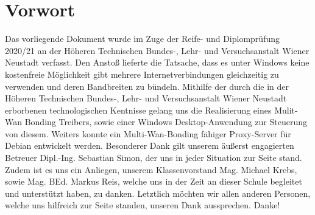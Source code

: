 \chapter{Vorwort}

Das vorliegende Dokument wurde im Zuge der Reife- und Diplomprüfung 2020/21 an
der Höheren Technischen Bundes-, Lehr- und Versuchsanstalt Wiener Neustadt verfasst.
\newline
\newline
Den Anstoß lieferte die Tatsache, dass es unter Windows keine kostenfreie Möglichkeit gibt mehrere Internetverbindungen gleichzeitig zu verwenden und deren Bandbreiten zu bündeln. Mithilfe der durch die in der Höheren Technischen Bundes-, Lehr- und Versuchsanstalt Wiener Neustadt erborbenen technologischen Kentnisse gelang uns die Realisierung eines Mulit-Wan Bonding Treibers, sowie einer Windows Desktop-Anwendung zur Steuerung von diesem. Weiters konnte ein Multi-Wan-Bonding fähiger Proxy-Server für Debian entwickelt werden.
\newline
\newline
Besonderer Dank gilt unserem äußerst engagierten Betreuer Dipl.-Ing. Sebastian Simon, der uns in jeder Situation zur Seite stand. Zudem ist es uns ein Anliegen, unserem Klassenvorstand Mag. Michael Krebs, sowie Mag. BEd. Markus Reis, welche uns in der Zeit an dieser Schule begleitet und unterstützt haben, zu danken. Letztlich möchten wir allen anderen Personen, welche uns hilfreich zur Seite standen, unseren Dank aussprechen. Danke!